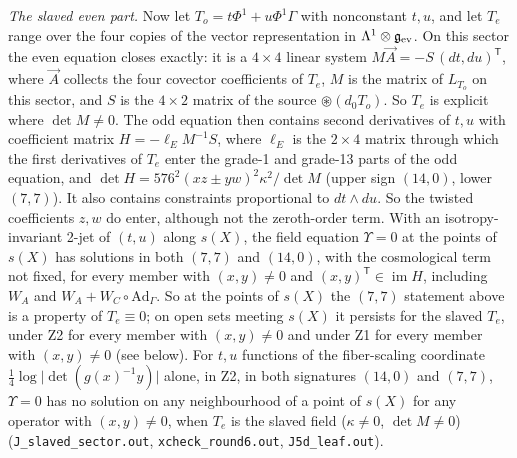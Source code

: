 \documentclass[11pt]{article}
\theoremstyle{remark}
\begin{document}
\emph{The slaved even part.} Now let $T_o=t\Phi^1+u\Phi^1\Gamma$ with nonconstant $t,u$, and let $T_e$ range over the four copies of the vector representation in $\Lambda^1\otimes\mathfrak g_{\rm ev}$. On this sector the even equation closes exactly: it is a $4\times4$ linear system $M\vec A=-S\,(dt,du)^{\mathsf T}$, where $\vec A$ collects the four covector coefficients of $T_e$, $M$ is the matrix of $L_{T_o}$ on this sector, and $S$ is the $4\times2$ matrix of the source $\circledast(d_0T_o)$. So $T_e$ is explicit where $\det M\neq0$. The odd equation then contains second derivatives of $t,u$ with coefficient matrix $H=-\ell_EM^{-1}S$, where $\ell_E$ is the $2\times4$ matrix through which the first derivatives of $T_e$ enter the grade-1 and grade-13 parts of the odd equation, and $\det H=576^2(xz\pm yw)^2\kappa^2/\det M$ (upper sign $(14,0)$, lower $(7,7)$). It also contains constraints proportional to $dt\wedge du$. So the twisted coefficients $z,w$ do enter, although not the zeroth-order term. With an isotropy-invariant 2-jet of $(t,u)$ along $s(X)$, the field equation $\Upsilon=0$ at the points of $s(X)$ has solutions in both $(7,7)$ and $(14,0)$, with the cosmological term not fixed, for every member with $(x,y)\neq0$ and $(x,y)^{\mathsf T}\in\operatorname{im}H$, including $W_A$ and $W_A+W_C\circ\mathrm{Ad}_\Gamma$. So at the points of $s(X)$ the $(7,7)$ statement above is a property of $T_e\equiv0$; on open sets meeting $s(X)$ it persists for the slaved $T_e$, under Z2 for every member with $(x,y)\neq0$ and under Z1 for every member with $(x,y)\neq0$ (see below). For $t,u$ functions of the fiber-scaling coordinate $\tfrac14\log\lvert\det(g(x)^{-1}y)\rvert$ alone, in Z2, in both signatures $(14,0)$ and $(7,7)$, $\Upsilon=0$ has no solution on any neighbourhood of a point of $s(X)$ for any operator with $(x,y)\neq0$, when $T_e$ is the slaved field ($\kappa\neq0$, $\det M\neq0$) (\texttt{J\_slaved\_sector.out}, \texttt{xcheck\_round6.out}, \texttt{J5d\_leaf.out}).
\end{document}

